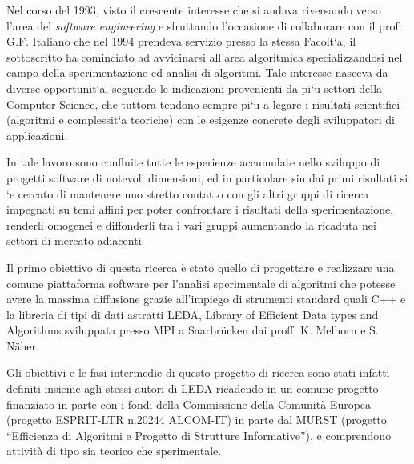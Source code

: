 \documentclass[11pt]{article}
\begin{document}
Nel corso del 1993, visto il crescente interesse che si andava
riversando verso l'area del {\em software engineering} e sfruttando
l'occasione di collaborare con il prof.  G.F. Italiano che nel 1994
prendeva servizio presso la stessa Facolt\a`a, il sottoscritto ha
cominciato ad avvicinarsi all'area algoritmica specializzandosi nel
campo della sperimentazione ed analisi di algoritmi.  Tale interesse
nasceva da diverse opportunit\a`a, seguendo le indicazioni provenienti
da pi\a`u settori della Computer Science, che tuttora tendono sempre
pi\a`u a legare i risultati scientifici (algoritmi e complessit\a`a
teoriche) con le esigenze concrete degli sviluppatori di applicazioni.

In tale lavoro sono confluite tutte le esperienze accumulate nello
sviluppo di progetti software di notevoli dimensioni, ed in
particolare sin dai primi risultati si \a`e cercato di mantenere uno
stretto contatto con gli altri gruppi di ricerca impegnati su temi
affini per poter confrontare i risultati della sperimentazione,
renderli omogenei e diffonderli tra i vari gruppi aumentando la
ricaduta nei settori di mercato adiacenti.
 
Il primo obiettivo di questa ricerca \`e stato quello di progettare e
realizzare  una comune piattaforma software per l'analisi sperimentale
di algoritmi che potesse avere la massima diffusione grazie
all'impiego  di strumenti standard quali C++ e la libreria di tipi di dati
astratti  LEDA, Library of Efficient Data types and Algorithms
sviluppata presso MPI a Saarbr\"ucken dai proff. K.  Melhorn e S. N\"aher.

Gli obiettivi e le fasi intermedie di questo progetto di ricerca sono
stati infatti definiti insieme agli stessi autori di LEDA ricadendo in
un comune progetto finanziato in parte con i fondi della Commissione
della  Comunit\`a Europea (progetto ESPRIT-LTR n.20244 ALCOM-IT) in
parte  dal MURST (progetto ``Efficienza di Algoritmi e Progetto di
Strutture  Informative''), e comprendono attivit\`a di tipo sia
teorico  che sperimentale.
\end{document}
